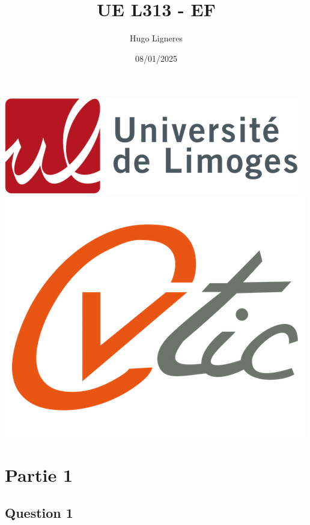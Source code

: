 \documentclass[12pt,a4paper]{article}
\title{UE L313 - EF}
\author{Hugo Ligneres}
\date{08/01/2025}
\begin{document}
\maketitle

\hrulefill
\vspace{6cm}
\begin{center}
	\includegraphics[scale=.4]{../images/univ.png}
		\\
		\vspace{2cm}
	\includegraphics[scale=.25]{../images/cvtic.png}
\end{center}


\newpage

\section*{Partie 1}
	
	 \subsection*{Question 1}
	 
\end{document}
